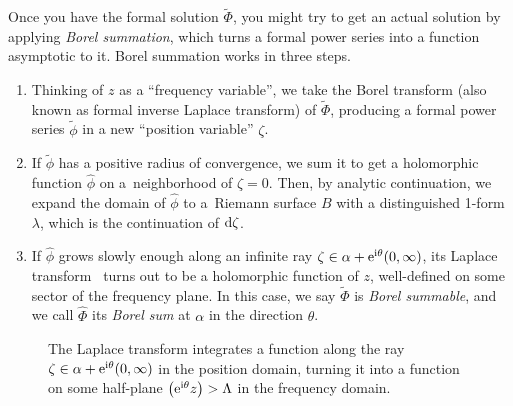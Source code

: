 \documentclass[pdftex]{sigma}
\let\Re\relax
\DeclareMathOperator{\Re}{Re}
\newcommand{\series}[1]{\tilde{#1}}
\newcommand{\laplace}{\mathcal{L}}
\numberwithin{equation}{section}
\begin{document}
Once you have the formal solution $\series{\Phi}$, you might try to get an actual solution by applying {\em Borel summation}, which turns a formal power series into a function asymptotic to it. Borel summation works in three steps.
\begin{enumerate}\itemsep=0pt
\item[(1)] Thinking of $z$ as a ``frequency variable'', we take the Borel transform (also known as formal inverse Laplace transform) of $\series{\Phi}$, producing a formal power series $\series{\phi}$ in a new ``position variable'' $\zeta$.
\item[(2)] If $\series{\phi}$ has a positive radius of convergence, we sum it to get a holomorphic function $\hat{\phi}$ on a~neighborhood of $\zeta = 0$. Then, by analytic continuation, we expand the domain of $\hat{\phi}$ to a~Riemann surface $B$ with a distinguished 1-form $\lambda$, which is the continuation of ${\rm d}\zeta$.
\item[(3)] %
If $\hat{\phi}$ grows slowly enough along an infinite ray $\zeta \in \alpha + {\rm e}^{{\rm i}\theta}(0, \infty)$, its Laplace transform~\smash{$\hat{\Phi} := \laplace_{\zeta, \alpha}^\theta \hat{\phi}$} turns out to be a holomorphic function of $z$, well-defined on some sector of the frequency plane. In this case, we say $\series{\Phi}$ is {\em Borel summable}, and we call $\hat{\Phi}$ its {\em Borel sum} at $\alpha$ in the direction $\theta$.
\end{enumerate}

\begin{figure}[h]\centering
\basicLaplace
\caption{The Laplace transform \smash{$\laplace^\theta_{\zeta, \alpha}$} integrates a function along the ray $\zeta \in \alpha + {\rm e}^{{\rm i}\theta}(0, \infty)$ in the position domain, turning it into a function on some half-plane $\Re\bigl({\rm e}^{{\rm i}\theta} z\bigr) > \Lambda$ in the frequency domain.}
\end{figure}
\end{document}
